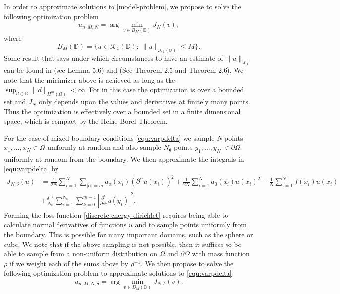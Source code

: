 In order to approximate solutions to \eqref{model-problem}, we propose to solve the following optimization problem
\begin{equation}\label{discrete-formulation}
 u_{n,M,N} = \arg\min_{v\in B_M(\mathbb{D})} J_N(v),
\end{equation}
where
\begin{equation}
 B_M(\mathbb{D}) = \{u\in \mathcal{K}_1(\mathbb{D}):~\|u\|_{\mathcal{K}_1(\mathbb{D})} \leq M\}.
\end{equation}
Some result that says under which circumstances to have an estimate of $\|u\|_{\mathcal{K}_{1}}$ can be found in \cite{xu2020finite} (see Lemma 5.6) and \cite{lu2021priori} (See Theorem 2.5 and Theorem 2.6).
We note that the minimizer above is achieved as long as the $\sup_{d\in \mathbb{D}} \|d\|_{H^m(\Omega)} < \infty$. For in this case the optimization is over a bounded set and $J_N$ only depends upon the values and derivatives at finitely many points. Thus the optimization is effectively over a bounded set in a finite dimensional space, which is compact by the Heine-Borel Theorem.

For the case of mixed boundary conditions \eqref{equ:varpdelta} we sample $N$ points $x_1,...,x_N\in \Omega$ uniformly at random and also sample $N_0$ points $y_1,...,y_{N_0}\in \partial \Omega$ uniformly at random from the boundary. We then approximate the integrals in \eqref{equ:varpdelta} by
\begin{equation}\label{discrete-energy-dirichlet}
\begin{aligned}
 J_{N,\delta}(u) &= \frac{1}{2N}\sum_{i=1}^N\sum_{|\alpha| = m} a_\alpha(x_i)(\partial^\alpha u(x_i))^2 + \frac{1}{2N}\sum_{i=1}^Na_0(x_i)u(x_i)^2 - \frac{1}{N}\sum_{i=1}^Nf(x_i)u(x_i) \\
 &+ \frac{\delta^{-1}}{N_0}\sum_{i=1}^{N_0} \sum_{k=0}^{m-1} \left|\frac{\partial^k}{\partial \nu^k}u(y_i)\right|^2.
 \end{aligned}
\end{equation}
Forming the loss function \eqref{discrete-energy-dirichlet} requires being able to calculate normal derivatives of functions $u$ and to sample points uniformly from the boundary. This is possible for many important domains, such as the sphere or cube. We note that if the above sampling is not possible, then it suffices to be able to sample from a non-uniform distribution on $\Omega$ and $\partial \Omega$ with mass function $\rho$ if we weight each of the sums above by $\rho^{-1}$. We then propose to solve the following optimization problem to approximate solutions to \eqref{equ:varpdelta}
\begin{equation}\label{discrete-formulation-dirichlet}
 u_{n,M,N,\delta} = \arg\min_{v\in B_M(\mathbb{D})} J_{N,\delta}(v).
\end{equation}
 
